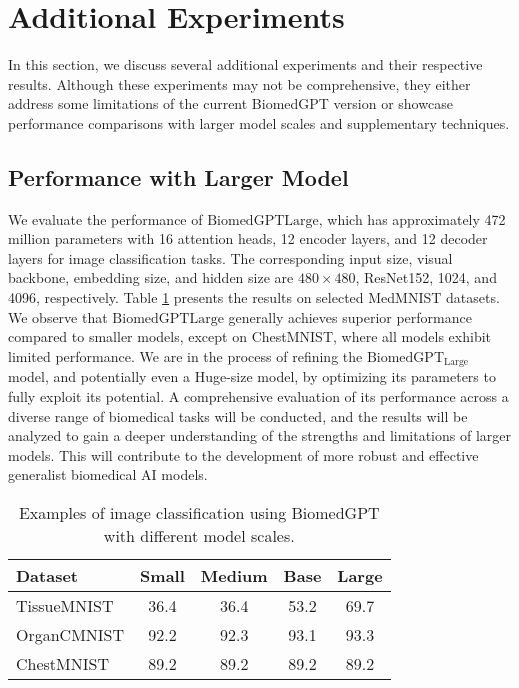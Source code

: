 \documentclass[10pt]{article} \usepackage[preprint]{tmlr}
\begin{document}
\section{Additional Experiments}
In this section, we discuss several additional experiments and their respective results. Although these experiments may not be comprehensive, they either address some limitations of the current BiomedGPT version or showcase performance comparisons with larger model scales and supplementary techniques.

\subsection{Performance with Larger Model}
We evaluate the performance of $\text{BiomedGPT}{\text{Large}}$, which has approximately 472 million parameters with 16 attention heads, 12 encoder layers, and 12 decoder layers for image classification tasks. The corresponding input size, visual backbone, embedding size, and hidden size are $480\times480$, ResNet152, 1024, and 4096, respectively. Table \ref{tab:biomedgpt_large} presents the results on selected MedMNIST datasets. We observe that $\text{BiomedGPT}{\text{Large}}$ generally achieves superior performance compared to smaller models, except on ChestMNIST, where all models exhibit limited performance. We are in the process of refining the $\text{BiomedGPT}_{\text{Large}}$ model, and potentially even a Huge-size model, by optimizing its parameters to fully exploit its potential. A comprehensive evaluation of its performance across a diverse range of biomedical tasks will be conducted, and the results will be analyzed to gain a deeper understanding of the strengths and limitations of larger models. This will contribute to the development of more robust and effective generalist biomedical AI models.

\begin{table}[htbp]
\centering
\caption{Examples of image classification using BiomedGPT with different model scales.} \label{tab:biomedgpt_large} 
\begin{tabular}{lcccc}
\toprule
Dataset & Small & Medium & Base & Large \\ \midrule
TissueMNIST & 36.4 & 36.4 & 53.2 & 69.7 \\
OrganCMNIST & 92.2 & 92.3 & 93.1 & 93.3 \\
ChestMNIST & 89.2 & 89.2 & 89.2 & 89.2 \\ \bottomrule
\end{tabular}
\end{table}
\end{document}

